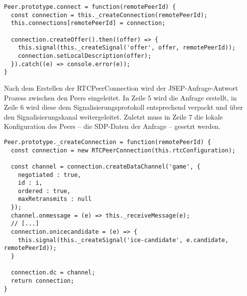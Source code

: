 \vspace{5pt}
\lstset{language=js, style=STYLE_CODE_JS}
\begin{minipage}{\textwidth}
\begin{singlespace}
\begin{lstlisting}[caption={\textit{connect}-Funktion -- peer.js}, captionpos=b, label={lst:connectfunction}]
Peer.prototype.connect = function(remotePeerId) {
  const connection = this._createConnection(remotePeerId);
  this.connections[remotePeerId] = connection;

  connection.createOffer().then((offer) => {
    this.signal(this._createSignal('offer', offer, remotePeerId));
    connection.setLocalDescription(offer);
  }).catch((e) => console.error(e));
}
\end{lstlisting}
\end{singlespace}
\end{minipage}

Nach dem Erstellen der RTCPeerConnection wird der \acs{JSEP}-Anfrage-Antwort Prozess zwischen den Peers eingeleitet. In Zeile 5 wird die Anfrage erstellt, in Zeile 6 wird diese dem Signalisierungsprotokoll entsprechend verpackt und über den Signalisierungskanal weitergeleitet. Zuletzt muss in Zeile 7 die lokale Konfiguration des Peers -- die SDP-Daten der Anfrage -- gesetzt werden.

\vspace{5pt}
\lstset{language=js, style=STYLE_CODE_JS}
\begin{minipage}{\textwidth}
\begin{singlespace}
\begin{lstlisting}[caption={Erstellen von Verbindungen und Datenkanälen -- peer.js}, captionpos=b, label={lst:makertcpeerconnection}]
Peer.prototype._createConnection = function(remotePeerId) {
  const connection = new RTCPeerConnection(this.rtcConfiguration);

  const channel = connection.createDataChannel('game', {
    negotiated : true,
    id : i,
    ordered : true,
    maxRetransmits : null
  });
  channel.onmessage = (e) => this._receiveMessage(e);
  // [...]
  connection.onicecandidate = (e) => {
    this.signal(this._createSignal('ice-candidate', e.candidate, remotePeerId));
  }
 
  connection.dc = channel;
  return connection;
}
\end{lstlisting}
\end{singlespace}
\end{minipage}

